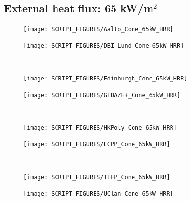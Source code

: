 \documentclass{book}
\begin{document}
\begin{landscape}
\subsection{External heat flux: 65 kW/m$^2$}
\begin{minipage}{0.65\textwidth}
\begin{figure}[H]
{\texttt{[image: SCRIPT\_FIGURES/Aalto\_Cone\_65kW\_HRR]}}\\
\end{figure}
\end{minipage}
\begin{minipage}{0.35\textwidth}
\begin{figure}[H]
{\texttt{[image: SCRIPT\_FIGURES/DBI\_Lund\_Cone\_65kW\_HRR]}}\\
\end{figure}
\end{minipage}\\
\begin{minipage}{0.65\textwidth}
\begin{figure}[H]
{\texttt{[image: SCRIPT\_FIGURES/Edinburgh\_Cone\_65kW\_HRR]}}\\
\end{figure}
\end{minipage}
\begin{minipage}{0.35\textwidth}
\begin{figure}[H]
{\texttt{[image: SCRIPT\_FIGURES/GIDAZE+\_Cone\_65kW\_HRR]}}\\
\end{figure}
\end{minipage}\\
\vfill 

\begin{minipage}{0.65\textwidth}
\begin{figure}[H]
{\texttt{[image: SCRIPT\_FIGURES/HKPoly\_Cone\_65kW\_HRR]}}\\
\end{figure}
\end{minipage}
\begin{minipage}{0.35\textwidth}
\begin{figure}[H]
{\texttt{[image: SCRIPT\_FIGURES/LCPP\_Cone\_65kW\_HRR]}}\\
\end{figure}
\end{minipage}\\
\begin{minipage}{0.65\textwidth}
\begin{figure}[H]
{\texttt{[image: SCRIPT\_FIGURES/TIFP\_Cone\_65kW\_HRR]}}\\
\end{figure}
\end{minipage}
\begin{minipage}{0.35\textwidth}
\begin{figure}[H]
{\texttt{[image: SCRIPT\_FIGURES/UClan\_Cone\_65kW\_HRR]}}\\
\end{figure}
\end{minipage}\\
\vfill 


\end{landscape}
\end{document}
